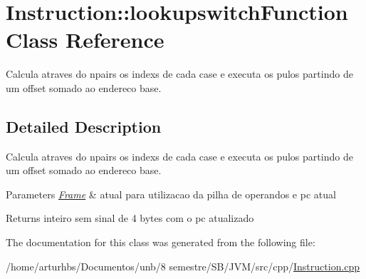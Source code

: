 \hypertarget{classInstruction_1_1lookupswitchFunction}{}\section{Instruction\+:\+:lookupswitch\+Function Class Reference}
\label{classInstruction_1_1lookupswitchFunction}


Calcula atraves do npairs os indexs de cada case e executa os pulos partindo de um offset somado ao endereco base.  




\subsection{Detailed Description}
Calcula atraves do npairs os indexs de cada case e executa os pulos partindo de um offset somado ao endereco base. 


\begin{DoxyParams}{Parameters}
{\em \hyperlink{classFrame}{Frame}} & atual para utilizacao da pilha de operandos e pc atual \\
\hline
\end{DoxyParams}
\begin{DoxyReturn}{Returns}
inteiro sem sinal de 4 bytes com o pc atualizado 
\end{DoxyReturn}


The documentation for this class was generated from the following file\+:\begin{DoxyCompactItemize}
\item 
/home/arturhbs/\+Documentos/unb/8 semestre/\+S\+B/\+J\+V\+M/src/cpp/\hyperlink{Instruction_8cpp}{Instruction.\+cpp}\end{DoxyCompactItemize}
